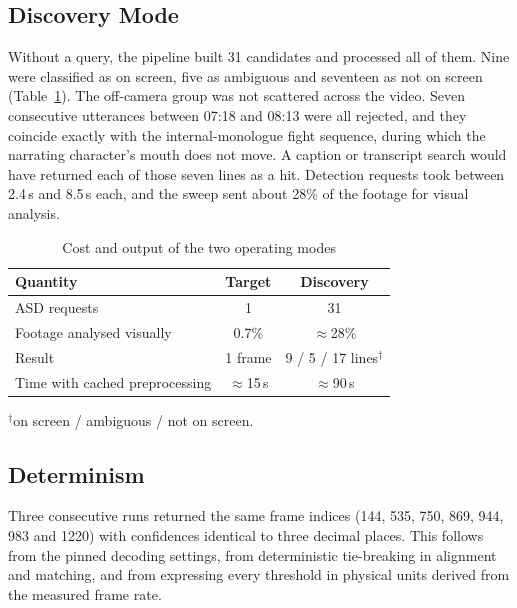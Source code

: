 \documentclass[conference]{IEEEtran}
\begin{document}
\subsection{Discovery Mode}
Without a query, the pipeline built 31 candidates and processed all of them. Nine were classified as on screen, five as ambiguous and seventeen as not on screen (Table~\ref{tab:modes}). The off-camera group was not scattered across the video. Seven consecutive utterances between 07:18 and 08:13 were all rejected, and they coincide exactly with the internal-monologue fight sequence, during which the narrating character's mouth does not move. A caption or transcript search would have returned each of those seven lines as a hit. Detection requests took between 2.4\,s and 8.5\,s each, and the sweep sent about 28\% of the footage for visual analysis.

\begin{table}[t]
\centering
\caption{Cost and output of the two operating modes}
\label{tab:modes}
\footnotesize
\begin{tabular}{@{}lcc@{}}
\toprule
Quantity & Target & Discovery \\
\midrule
ASD requests & 1 & 31 \\
Footage analysed visually & 0.7\% & $\approx$28\% \\
Result & 1 frame & 9 / 5 / 17 lines$^\dagger$ \\
Time with cached preprocessing & $\approx$15\,s & $\approx$90\,s \\
\bottomrule
\end{tabular}

\vspace{2pt}
\parbox{\columnwidth}{\scriptsize $^\dagger$on screen / ambiguous / not on screen.}
\end{table}

\subsection{Determinism}
Three consecutive runs returned the same frame indices (144, 535, 750, 869, 944, 983 and 1220) with confidences identical to three decimal places. This follows from the pinned decoding settings, from deterministic tie-breaking in alignment and matching, and from expressing every threshold in physical units derived from the measured frame rate.
\end{document}
